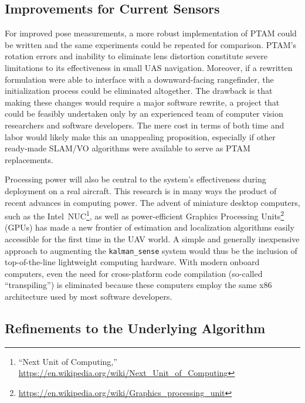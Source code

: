 \subsection{Improvements for Current Sensors}

For improved pose measurements, a more robust implementation of PTAM could be written and the same experiments could be repeated for comparison. PTAM's rotation errors and inability to eliminate lens distortion constitute severe limitations to its effectiveness in small UAS navigation. Moreover, if a rewritten formulation were able to interface with a downward-facing rangefinder, the initialization process could be eliminated altogether. The drawback is that making these changes would require a major software rewrite, a project that could be feasibly undertaken only by an experienced team of computer vision researchers and software developers. The mere cost in terms of both time and labor would likely make this an unappealing proposition, especially if other ready-made SLAM/VO algorithms were available to serve as PTAM replacements.

Processing power will also be central to the system's effectiveness during deployment on a real aircraft. This research is in many ways the product of recent advances in computing power. The advent of miniature desktop computers, such as the Intel~NUC\footnote{``Next Unit of Computing,'' \url{https://en.wikipedia.org/wiki/Next_Unit_of_Computing}}, as well as power-efficient Graphics Processing Units\footnote{\url{https://en.wikipedia.org/wiki/Graphics_processing_unit}} (GPUs) has made a new frontier of estimation and localization algorithms easily accessible for the first time in the UAV world. A simple and generally inexpensive approach to augmenting the \texttt{kalman\_sense} system would thus be the inclusion of top-of-the-line lightweight computing hardware. With modern onboard computers, even the need for cross-platform code compilation (so-called ``transpiling'') is eliminated because these computers employ the same x86 architecture used by most software developers.

\subsection{Refinements to the Underlying Algorithm}

